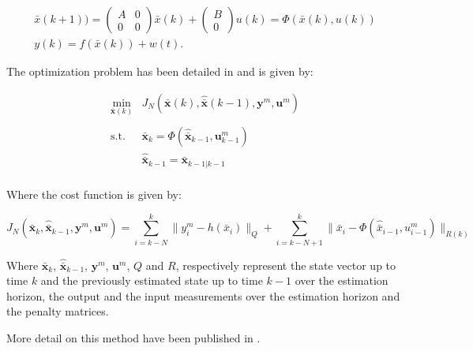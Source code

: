 \begin{equation}
\begin{array}{ll}
        \bar{x}(k+1)) = \begin{pmatrix}
        A & 0 \\
        0 & 0
        \end{pmatrix} \bar{x}(k) + \begin{pmatrix} B \\ 0 \end{pmatrix} u(k) = \Phi(\bar{x}(k), u(k))\\
        y(k) = f(\bar{x}(k)) + w(t).
\end{array}
\end{equation}

The optimization problem has been detailed in \cite{moussaDataBasedExtendedMoving2023} and is given by:

\begin{equation}
\begin{array}{ll}
\min_{\bar{\mathbf{x}}(k)} &  J_{N}(\bar{\mathbf{x}}(k), \hat{\bar{\mathbf{x}}}(k-1), \mathbf{y}^m,\mathbf{u}^m)   \\
 & \\
\text{s.t.} & \bar{\mathbf{x}}_k = \Phi(\hat{\bar{\mathbf{x}}}_{k-1},\mathbf{u}^m_{k-1}) \\
& \hat{\bar{\mathbf{x}}}_{k-1} = \bar{\mathbf{x}}_{k-1|k-1} \\

\end{array}
\end{equation}

Where the cost function is given by:

\begin{equation}
        J_{N}(\bar{\mathbf{x}}_k, \hat{\bar{\mathbf{x}}}_{k-1}, \mathbf{y}^m,\mathbf{u}^m) = \sum_{i=k-N}^{k}{\lVert y_i^m-h(\bar{x}_i) \rVert_Q} + \sum_{i=k-N+1}^{k}{\lVert \bar{x}_i-\Phi(\hat{\bar{x}}_{i-1},u^m_{i-1}) \rVert_{R(k)}}
\end{equation}

\normalsize
Where $\bar{\mathbf{x}}_k$, $\hat{\bar{\mathbf{x}}}_{k-1}$, $\mathbf{y}^m$, $\mathbf{u}^m$, $Q$ and $R$, respectively represent the state vector up to time $k$ and the previously estimated state up to time $k-1$ over the estimation horizon, the output and the input measurements over the estimation horizon and the penalty matrices.
\medskip

More detail on this method have been published in \cite{moussaDataBasedExtendedMoving2023}. \medskip



